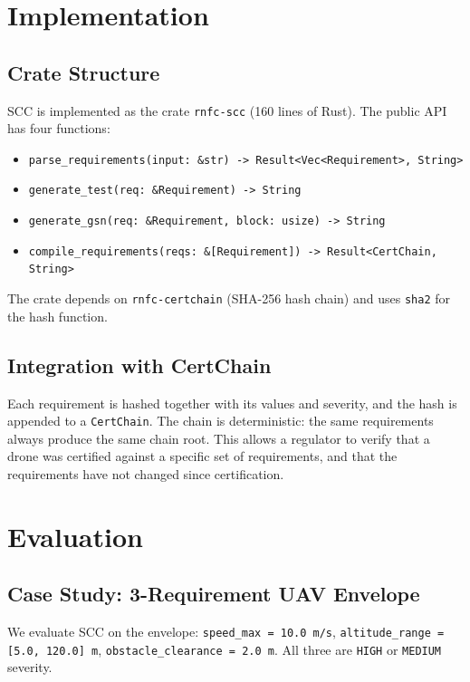 \section{Implementation}

\subsection{Crate Structure}
SCC is implemented as the crate \texttt{rnfc-scc} (160 lines of
Rust). The public API has four functions:
\begin{itemize}
    \item \texttt{parse\_requirements(input: \&str) -> Result<Vec<Requirement>, String>}
    \item \texttt{generate\_test(req: \&Requirement) -> String}
    \item \texttt{generate\_gsn(req: \&Requirement, block: usize) -> String}
    \item \texttt{compile\_requirements(reqs: \&[Requirement]) -> Result<CertChain, String>}
\end{itemize}
The crate depends on \texttt{rnfc-certchain} (SHA-256 hash chain)
and uses \texttt{sha2} for the hash function.

\subsection{Integration with CertChain}
Each requirement is hashed together with its values and severity,
and the hash is appended to a \texttt{CertChain}. The chain is
deterministic: the same requirements always produce the same chain
root. This allows a regulator to verify that a drone was certified
against a specific set of requirements, and that the requirements
have not changed since certification.

\section{Evaluation}

\subsection{Case Study: 3-Requirement UAV Envelope}
We evaluate SCC on the envelope: \texttt{speed\_max = 10.0~m/s},
\texttt{altitude\_range = [5.0, 120.0]~m}, \texttt{obstacle\_clearance
= 2.0~m}. All three are \texttt{HIGH} or \texttt{MEDIUM} severity.


